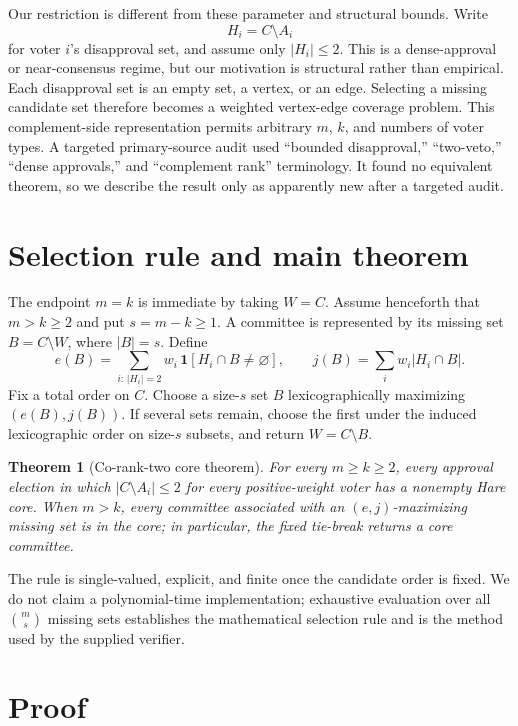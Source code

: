 \documentclass[11pt]{article}
\newtheorem{theorem}{Theorem}
\begin{document}
Our restriction is different from these parameter and structural bounds.
Write
\[
  H_i=C\setminus A_i
\]
for voter $i$'s disapproval set, and assume only $|H_i|\le2$.  This is a
dense-approval or near-consensus regime, but our motivation is structural
rather than empirical.  Each disapproval set is an empty set, a vertex, or
an edge.  Selecting a missing candidate set therefore becomes a weighted
vertex-edge coverage problem.  This complement-side representation permits
arbitrary $m$, $k$, and numbers of voter types.  A targeted primary-source
audit used ``bounded disapproval,'' ``two-veto,'' ``dense approvals,'' and
``complement rank'' terminology.  It found no equivalent theorem, so we
describe the result only as apparently new after a targeted audit.

\section{Selection rule and main theorem}

The endpoint $m=k$ is immediate by taking $W=C$.  Assume henceforth that
$m>k\ge2$ and put $s=m-k\ge1$.  A committee is represented by its missing
set $B=C\setminus W$, where $|B|=s$.  Define
\[
 e(B)=\sum_{i:\,|H_i|=2} w_i\,\mathbf 1[H_i\cap B\ne\varnothing],
 \qquad
 j(B)=\sum_i w_i|H_i\cap B|.
 \tag{2}
\]
Fix a total order on $C$.  Choose a size-$s$ set $B$ lexicographically
maximizing $(e(B),j(B))$.  If several sets remain, choose the first under the
induced lexicographic order on size-$s$ subsets, and return $W=C\setminus B$.

\begin{theorem}[Co-rank-two core theorem]\label{thm:main}
For every $m\ge k\ge2$, every approval election in which $|C\setminus
A_i|\le2$ for every positive-weight voter has a nonempty Hare core.  When
$m>k$, every committee associated with an $(e,j)$-maximizing missing set is
in the core; in particular, the fixed tie-break returns a core committee.
\end{theorem}

The rule is single-valued, explicit, and finite once the candidate order is
fixed.  We do not claim a polynomial-time
implementation; exhaustive evaluation over all $\binom ms$ missing sets
establishes the mathematical selection rule and is the method used by the
supplied verifier.

\section{Proof}
\end{document}
